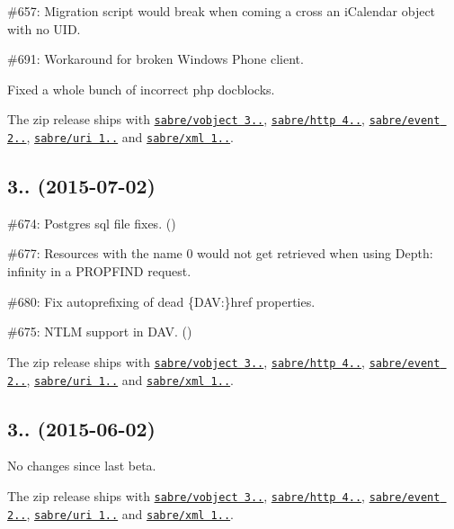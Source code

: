 \begin{DoxyItemize}
\item \#657\+: Migration script would break when coming a cross an i\+Calendar object with no U\+ID.
\item \#691\+: Workaround for broken Windows Phone client.
\item Fixed a whole bunch of incorrect php docblocks.
\item The zip release ships with \href{http://sabre.io/vobject/}{\tt sabre/vobject 3..}, \href{http://sabre.io/http/}{\tt sabre/http 4..}, \href{http://sabre.io/event/}{\tt sabre/event 2..}, \href{http://sabre.io/uri/}{\tt sabre/uri 1..} and \href{http://sabre.io/xml/}{\tt sabre/xml 1..}.
\end{DoxyItemize}

\subsection*{3.. (2015-\/07-\/02) }


\begin{DoxyItemize}
\item \#674\+: Postgres sql file fixes. ()
\item \#677\+: Resources with the name \textquotesingle{}0\textquotesingle{} would not get retrieved when using {\ttfamily Depth\+: infinity} in a {\ttfamily P\+R\+O\+P\+F\+I\+ND} request.
\item \#680\+: Fix \textquotesingle{}autoprefixing\textquotesingle{} of dead {\ttfamily \{D\+AV\+:\}href} properties.
\item \#675\+: N\+T\+LM support in D\+AV. ()
\item The zip release ships with \href{http://sabre.io/vobject/}{\tt sabre/vobject 3..}, \href{http://sabre.io/http/}{\tt sabre/http 4..}, \href{http://sabre.io/event/}{\tt sabre/event 2..}, \href{http://sabre.io/uri/}{\tt sabre/uri 1..} and \href{http://sabre.io/xml/}{\tt sabre/xml 1..}.
\end{DoxyItemize}

\subsection*{3.. (2015-\/06-\/02) }


\begin{DoxyItemize}
\item No changes since last beta.
\item The zip release ships with \href{http://sabre.io/vobject/}{\tt sabre/vobject 3..}, \href{http://sabre.io/http/}{\tt sabre/http 4..}, \href{http://sabre.io/event/}{\tt sabre/event 2..}, \href{http://sabre.io/uri/}{\tt sabre/uri 1..} and \href{http://sabre.io/xml/}{\tt sabre/xml 1..}.
\end{DoxyItemize}

